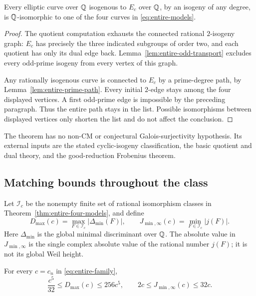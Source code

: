 \begin{theorem}\label{thm:entire-four-models}
Every elliptic curve over $\mathbb Q$ isogenous to $E_c$ over $\mathbb Q$,
by an isogeny of any degree, is $\mathbb Q$-isomorphic to one of the four
curves in \eqref{eq:entire-models}.
\end{theorem}

\begin{proof}
The quotient computation exhausts the connected rational
$2$-isogeny graph: $E_c$ has precisely the three indicated subgroups
of order two, and each quotient has only its dual edge back.
Lemma~\ref{lem:entire-odd-transport} excludes every odd-prime
isogeny from every vertex of this graph.

Any rationally isogenous curve is connected to $E_c$ by a
prime-degree path, by Lemma~\ref{lem:entire-prime-path}. Every initial
$2$-edge stays among the four displayed vertices. A first odd-prime
edge is impossible by the preceding paragraph. Thus the entire path
stays in the list. Possible isomorphisms between displayed vertices
only shorten the list and do not affect the conclusion.
\end{proof}

The theorem has no non-CM or conjectural Galois-surjectivity hypothesis.
Its external inputs are the stated cyclic-isogeny classification,
the basic quotient and dual theory, and the good-reduction Frobenius
theorem.

\subsection{Matching bounds throughout the class}

Let $\mathcal I_c$ be the nonempty finite set of rational isomorphism
classes in Theorem~\ref{thm:entire-four-models}, and define
\[
 D_{\max}(c)=\max_{F\in\mathcal I_c}|\Delta_{\min}(F)|,\qquad
 J_{\min,\infty}(c)=\min_{F\in\mathcal I_c}|j(F)|.
\]
Here $\Delta_{\min}$ is the global minimal discriminant over $\mathbb Q$.
The absolute value in $J_{\min,\infty}$ is the single complex
absolute value of the rational number $j(F)$; it is not its global
Weil height.

\begin{theorem}\label{thm:entire-class-bounds}
For every $c=c_n$ in \eqref{eq:entire-family},
\begin{equation}\label{eq:entire-class-bounds}
 \frac{c^5}{32}\le D_{\max}(c)\le256c^5,\qquad
 2c\le J_{\min,\infty}(c)\le32c.
\end{equation}
\end{theorem}

